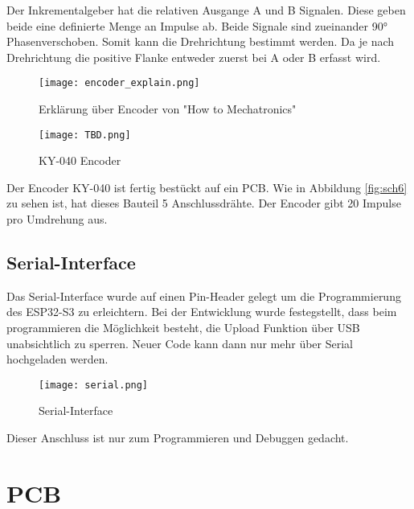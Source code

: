         
        
        Der Inkrementalgeber hat die relativen Ausgange A und B Signalen. Diese geben beide
        eine definierte Menge an Impulse ab. Beide Signale sind zueinander 90° Phasenverschoben. Somit
        kann die Drehrichtung bestimmt werden. Da je nach Drehrichtung die positive Flanke entweder
        zuerst bei A oder B erfasst wird.

            \begin{figure}[h!]
                \centering
                \texttt{[image: encoder\_explain.png]}
                \caption{Erklärung über Encoder von "How to Mechatronics"\cite{dejan_how_2016}}
                \label{fig:sch7}

            \end{figure}

            \begin{figure}[h!]
                \centering
                \texttt{[image: TBD.png]}
                \caption{KY-040 Encoder}
                \label{fig:sch8}

            \end{figure}
        Der Encoder KY-040 ist fertig bestückt auf ein PCB. Wie in Abbildung \ref{fig:sch6} zu sehen ist, 
        hat dieses Bauteil 5 Anschlussdrähte. Der Encoder gibt 20 Impulse pro Umdrehung aus.

        \newpage
        
        \subsection{Serial-Interface}
        Das Serial-Interface wurde auf einen Pin-Header gelegt um die Programmierung des ESP32-S3
        zu erleichtern. Bei der Entwicklung wurde festegstellt, dass beim programmieren 
        die Möglichkeit besteht, die Upload Funktion über USB unabsichtlich zu sperren. Neuer
        Code kann dann nur mehr über Serial hochgeladen werden. 

            \begin{figure}[h!]
                \centering
                \texttt{[image: serial.png]}
                \caption{Serial-Interface}
                \label{fig:sch9}

            \end{figure}
        
        Dieser Anschluss ist nur zum Programmieren und Debuggen gedacht.
    \newpage
    \section{PCB}
